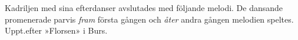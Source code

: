 Kadriljen med sina efterdanser avslutades med följande melodi.
De dansande promenerade parvis \textit{fram} första gången och
\textit{åter} andra gången melodien speltes. Uppt.\@ efter »Florsen» i Burs.